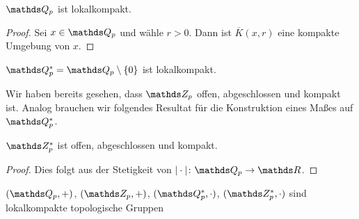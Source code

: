 \begin{prop}
$\Q_p$ ist lokalkompakt.
\end{prop}
\begin{proof}
Sei $x\in \Q_p$ und wähle $r>0$. Dann ist $\overline{K}(x,r)$ eine kompakte Umgebung von $x$.
\end{proof}

\begin{prop}
$\Q_p^\ast=\Q_p \setminus \{0\}$ ist lokalkompakt.
\end{prop}
Wir haben bereits gesehen, dass $\Z_p$ offen, abgeschlossen und kompakt ist.
Analog brauchen wir folgendes Resultat für die Konstruktion eines Maßes auf $\Q_p^\ast$.
\begin{prop}
$\Z_p^\ast$ ist offen, abgeschlossen und kompakt.
\end{prop}
\begin{proof}
Dies folgt aus der Stetigkeit von $\abs{\cdot} \colon \Q_p \to \R$.
\end{proof}

\begin{prop}
$(\Q_p,+)$, $(\Z_p,+)$, $(\Q_p^\ast,\cdot)$, $(\Z_p^\ast,\cdot)$
sind lokalkompakte topologische Gruppen
\end{prop}